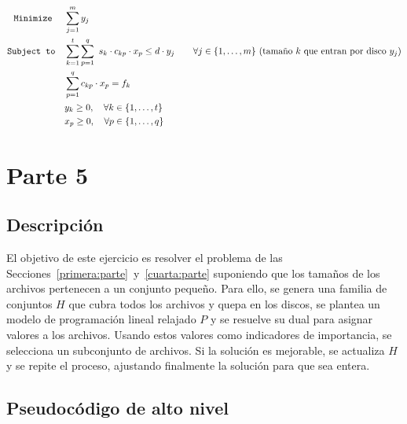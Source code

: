 \documentclass[11pt, a4paper, pdftex]{article}
\begin{document}
\begin{alignat*}{2}
	\minimize
	& \sum_{j = 1}^{m} y_{j}\\
	\subjto
	& \sum_{k=1}^{t} \sum_{p = 1}^{q}\ s_{k} \cdot c_{kp} \cdot x_{p} \le d\cdot y_{j} \qquad \forall j \in \{1, \ldots, m\}\ \text{(tamaño $k$ que entran por disco $y_{j}$)}\\
	& \sum_{p = 1}^{q} c_{kp} \cdot x_{p} = f_{k} \\
	& y_{k} \ge 0, \quad \forall k \in \{1, \ldots, t\} \\
	& x_{p} \ge 0, \quad \forall p \in \{1, \ldots, q\}
\end{alignat*}

\section{Parte 5}\label{quinta:parte}

\subsection{Descripción}

El objetivo de este ejercicio es resolver el problema de las
Secciones~\ref{primera:parte}~y~\ref{cuarta:parte} suponiendo que los tamaños
de los archivos pertenecen a un conjunto pequeño. Para ello, se genera una
familia de conjuntos $H$ que cubra todos los archivos y quepa en los discos, se
plantea un modelo de programación lineal relajado $P$ y se resuelve su dual
para asignar valores a los archivos. Usando estos valores como indicadores de
importancia, se selecciona un subconjunto de archivos. Si la solución es
mejorable, se actualiza $H$ y se repite el proceso, ajustando finalmente la
solución para que sea entera.




\newpage
\subsection{Pseudocódigo de alto nivel}
\end{document}
